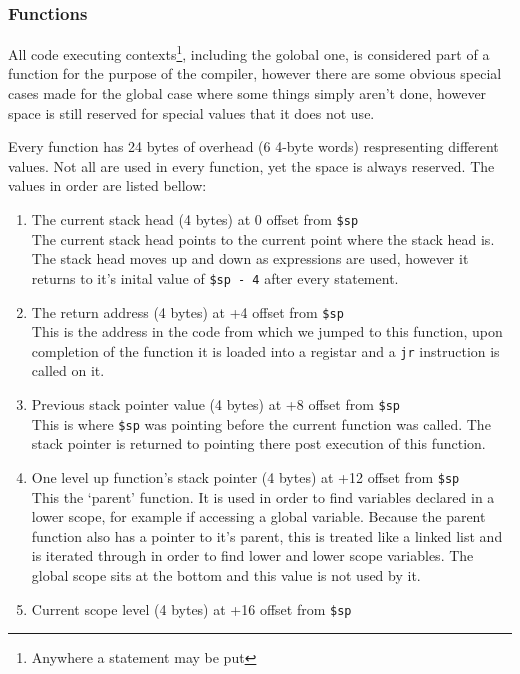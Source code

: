 \documentclass{article}
\begin{document}
\subsubsection{Functions}\label{function}
All code executing contexts\footnote{Anywhere a statement may be put}, including the golobal one, is considered part of a function for the purpose of the compiler, however there are some obvious special cases made for the global case where some things simply aren't done, however space is still reserved for special values that it does not use.

Every function has 24 bytes of overhead (6 4-byte words) respresenting different values. Not all are used in every function, yet the space is always reserved. The values in order are listed bellow:

\begin{enumerate}
\item The current stack head (4 bytes) at 0 offset from \texttt{\$sp} \\
The current stack head points to the current point where the stack head is. The stack head moves up and down as expressions are used, however it returns to it's inital value of \texttt{\$sp - 4} after every statement.
\item The return address (4 bytes) at +4 offset from \texttt{\$sp} \\
This is the address in the code from which we jumped to this function, upon completion of the function it is loaded into a registar and a \texttt{jr} instruction is called on it.
\item Previous stack pointer value (4 bytes) at +8 offset from \texttt{\$sp} \\
This is where \texttt{\$sp} was pointing before the current function was called. The stack pointer is returned to pointing there post execution of this function.
\item One level up function's stack pointer (4 bytes) at +12 offset from \texttt{\$sp} \\
This the `parent' function. It is used in order to find variables declared in a lower scope, for example if accessing a global variable. Because the parent function also has a pointer to it's parent, this is treated like a linked list and is iterated through in order to find lower and lower scope variables. The global scope sits at the bottom and this value is not used by it.
\item Current scope level (4 bytes) at +16 offset from \texttt{\$sp} \\

\end{enumerate}
\end{document}
